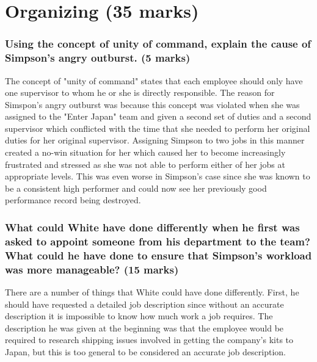 \documentclass[letterpaper,12pt,titlepage]{article}
\begin{document}
\part{Organizing (35 marks)}
\setcounter{section}{0}

\section{Using the concept of unity of command, explain the cause of Simpson's angry outburst. (5 marks)}

The concept of "unity of command" states that each employee should only have one supervisor to whom he or she is directly responsible. The reason for Simspon's angry outburst was because this concept was violated when she was assigned to the "Enter Japan" team and given a second set of duties and a second supervisor which conflicted with the time that she needed to perform her original duties for her original supervisor. Assigning Simpson to two jobs in this manner created a no-win situation for her which caused her to become increasingly frustrated and stressed as she was not able to perform either of her jobs at appropriate levels. This was even worse in Simpson's case since she was known to be a consistent high performer and could now see her previously good performance record being destroyed. 

\section{What could White have done differently when he first was asked to appoint someone from his department to the team? What could he have done to ensure that Simpson's workload was more manageable? (15 marks)}

There are a number of things that White could have done differently. First, he should have requested a detailed job description since without an accurate description it is impossible to know how much work a job requires. The description he was given at the beginning was that the employee would be required to research shipping issues involved in getting the company's kits to Japan, but this is too general to be considered an accurate job description. 
\end{document}
